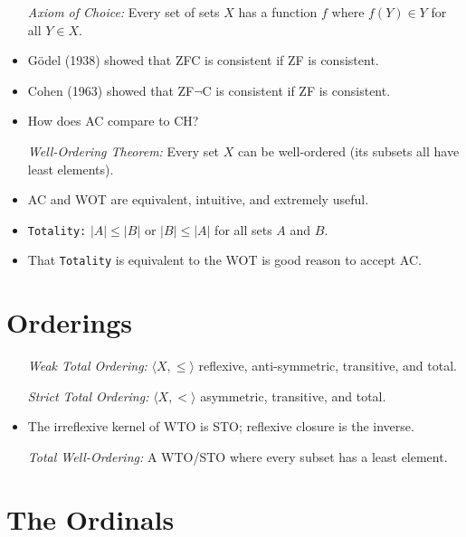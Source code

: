 \documentclass[a4paper, 11pt]{article} %
\newcommand{\tuple}[1]{\langle#1\rangle} %
\newcommand{\abs}[1]{|#1|} %
\begin{document}
\begin{itemize}
  \item[\it Axiom of Choice:] Every set of sets $X$ has a function $f$ where $f(Y)\in Y$ for all $Y\in X$. 
  \item G\"{o}del (1938) showed that ZFC is consistent if ZF is consistent.
  \item Cohen (1963) showed that ZF$\neg$C is consistent if ZF is consistent.
  \item How does AC compare to CH?
  \item[\it Well-Ordering Theorem:] Every set $X$ can be well-ordered (its subsets all have least elements). 
  \item AC and WOT are equivalent, intuitive, and extremely useful.
  \item \texttt{Totality:} $\abs{A} \leq \abs{B}$ or $\abs{B} \leq \abs{A}$ for all sets $A$ and $B$. 
  \item That \texttt{Totality} is equivalent to the WOT is good reason to accept AC.
\end{itemize}



\section*{Orderings}

\begin{itemize}
  \item[\it Weak Total Ordering:] $\tuple{X,\leq}$ reflexive, anti-symmetric, transitive, and total.
  \item[\it Strict Total Ordering:] $\tuple{X,<}$ asymmetric, transitive, and total.
    \item The irreflexive kernel of WTO is STO; reflexive closure is the inverse.
  \item[\it Total Well-Ordering:] A WTO/STO where every subset has a least element.
\end{itemize}




\section*{The Ordinals}
\end{document}
